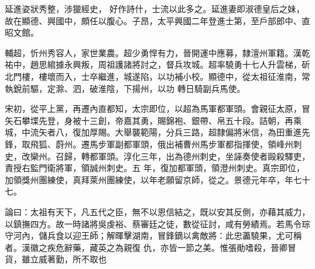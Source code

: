 \begin{pinyinscope}
 延進姿狀秀整，涉獵經史，
 好作詩什，士流以此多之。延進妻即淑德皇后之妹，故在顯德、興國中，頗任以腹心。子昂，太平興國二年登進士第，至戶部郎中、直昭文館。



 輔超，忻州秀容人，家世業農。超少勇悍有力，晉開運中應募，隸澶州軍籍。漢乾祐中，趙思綰據永興叛，周祖護諸將討之，督兵攻城。超率驍勇十七人升雲梯，斫北門樓，樓壞而入，士卒繼進，城遂陷，以功補小校。顯德中，從太祖征淮南，常執銳前驅，定滁、泗，破淮陰，下揚州，以功
 轉日騎副兵馬使。



 宋初，從平上黨，再遷內直都知，太宗即位，以超為馬軍都軍頭。會親征太原，冒矢石攀堞先登，身被十三創，帝嘉其勇，賜錦袍、銀帶、帛五十段。詰朝，再乘城，中流矢者八，復加厚賜。大舉襲範陽，分兵三路，超隸偏將米信，為田重進先鋒，取飛狐、蔚州。遷馬步軍副都軍頭，俄出補曹州馬步軍都指揮使，領峰州刺史，改欒州。召歸，轉都軍頭。淳化三年，出為德州刺史，坐誣奏使者毆殺驛吏，責授右監門衛將軍，領誠州刺史。五
 年，復加都軍頭，領澄州刺史。真宗即位，加領獎州團練使，真拜萊州團練使，以年老願留京師，從之。景德元年卒，年七十七。



 論曰：太祖有天下，凡五代之臣，無不以恩信結之，既以安其反側，亦藉其威力，以鎮撫四方。故一時諸將吳虔裕、蔡審廷之徒，數從征討，咸有勞績焉。若馬令琮守河內，儲兵食以迎王師；解暉擊湖南，冒鋒鏑以禽敵將：此忠藎驍果，尤可稱者。漢徽之疾危辭藥，藏英之為親復
 仇，亦皆一節之美。惟張勛嗜殺，晉卿冒貨，雖立威著勤，所不取也



\end{pinyinscope}